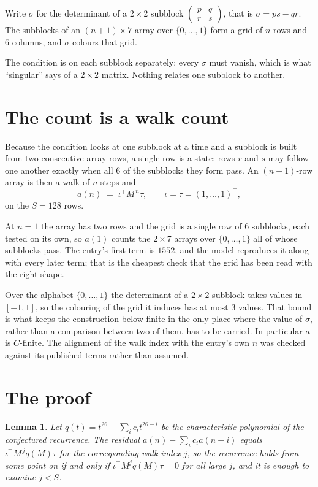 \documentclass[11pt,a4paper]{article}
\theoremstyle{plain}
\newtheorem{lemma}[theorem]{Lemma}
\theoremstyle{definition}
\begin{document}
Write $\sigma$ for the determinant of a $2\times2$ subblock
$\begin{pmatrix}p&q\\r&s\end{pmatrix}$, that is $\sigma=ps-qr$. The subblocks of an
$(n+1)\times7$ array over $\{0,\dots,1\}$ form a grid of $n$ rows and $6$
columns, and $\sigma$ colours that grid.

The condition is on each subblock separately: every $\sigma$ must vanish, which is what
``singular'' says of a $2\times2$ matrix. Nothing
relates one subblock to another.

\section{The count is a walk count}

Because the condition looks at one subblock at a time and a subblock is
built from two consecutive array rows, a single row is a state: rows $r$ and $s$ may follow one
another exactly when all $6$ of the subblocks they form pass. An $(n+1)$-row array is then a
walk of $n$ steps and
\[
a(n)\;=\;\iota^{\!\top}M^{\,n}\tau,\qquad\iota=\tau=(1,\dots,1)^{\!\top},
\]
on the $S=128$ rows.

At $n=1$ the array has two rows and the grid is a single row of $6$
subblocks, each tested on its own, so $a(1)$ counts the
$2\times7$ arrays over $\{0,\dots,1\}$ all of whose subblocks pass. The entry's
first term is $1552$, and the model reproduces it along with every later term; that is the
cheapest check that the grid has been read with the right shape.

Over the alphabet $\{0,\dots,1\}$ the determinant of a $2\times2$ subblock takes values in
$[-1,1]$, so the colouring of the grid it induces has at most $3$ values.
That bound is what keeps the construction below finite in the only place where the value of
$\sigma$, rather than a comparison between two of them, has to be carried.
In particular $a$ is $C$-finite. The alignment of the walk index with the entry's own $n$ was
checked against its published terms rather than assumed.

\section{The proof}

\begin{lemma}\label{lem:crit}
Let $q(t)=t^{26}-\sum_i c_it^{26-i}$ be the characteristic polynomial of the
conjectured recurrence. The residual $a(n)-\sum_ic_ia(n-i)$ equals
$\iota^{\!\top}M^{\,j}q(M)\tau$ for the corresponding walk index $j$, so the recurrence
holds from some point on if and only if $\iota^{\!\top}M^{j}q(M)\tau=0$ for all large $j$,
and it is enough to examine $j<S$.
\end{lemma}
\end{document}
